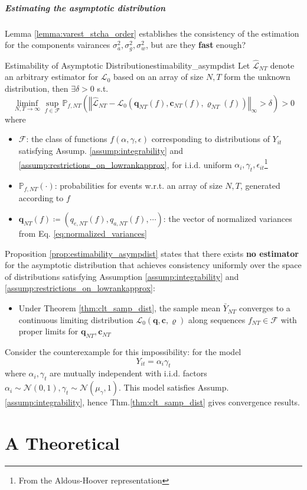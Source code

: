 \documentclass[twoside]{article}
\begin{document}
\subparagraph*{Estimating the asymptotic distribution}
Lemma \ref{lemma:varest_stcha_order} establishes the consistency of the estimation for the components vairances $\sigma^2_a,\sigma^2_g,\sigma^2_w$, but are they \textbf{fast} enough?
\begin{proposition}{Estimability of Asymptotic Distribution}{estimability_asympdist}
    Let $\hat{\mathcal{L}}_{NT}$ denote an arbitrary estimator for $\mathcal{L}_0$ based on an array of size $N,T$ form the unknown distribution, then $\exists \delta>0$ s.t. 
    \begin{equation*}
        \liminf_{N,T\rightarrow\infty} \sup_{f\in\mathcal{F}} \mathbb{P}_{f,NT} \left( \left\Vert \hat{\mathcal{L}}_{NT} - \mathcal{L}_0 \left(\mathbf{q}_{NT}(f),\mathbf{c}_{NT}(f),\varrho_{NT}(f)\right) \right\Vert _{\infty} > \delta \right) >0
    \end{equation*}
    where
    \begin{itemize}
        \item $\mathcal{F}$: the class of functions $f(\alpha,\gamma,\epsilon)$ corresponding to distributions of $Y_{it}$ satisfying Assump. \ref{assump:integrability} and \ref{assump:restrictions_on_lowrankapprox}, for i.i.d. uniform $\alpha_i,\gamma_t,\epsilon_{it}$\footnote{From the Aldous-Hoover representation}
        \item $\mathbb{P}_{f,NT}\left(\cdot\right)$: probabilities for events w.r.t. an array of size $N,T$, generated according to $f$
        \item $\mathbf{q}_{NT}(f) \coloneq \left(q_{e,NT}(f),q_{a,NT}(f),\cdots\right)$: the vector of normalized variances from Eq. \ref{eq:normalized_variances}
    \end{itemize}
\end{proposition}
Proposition \ref{prop:estimability_asympdist} states that there exists \textbf{no estimator} for the asymptotic distribution that achieves consistency uniformly over the space of distributions satisfying Assumption \ref{assump:integrability} and \ref{assump:restrictions_on_lowrankapprox}: 
\begin{itemize}
    \item Under Theorem \ref{thm:clt_samp_dist}, the sample mean $\bar{Y}_{NT}$ converges to a continuous limiting distribution $\mathcal{L}_0(\mathbf{q,c},\varrho)$ along sequences $f_{NT}\in \mathcal{F}$ with proper limits for $\mathbf{q}_{NT},\mathbf{c}_{NT}$
\end{itemize}

Consider the counterexample for this impossibility: for the model $$Y_{it} = \alpha_i\gamma_t$$ where $\alpha_i,\gamma_t$ are mutually independent with i.i.d. factors $\alpha_i \sim \mathcal{N}(0,1),\gamma_t\sim\mathcal{N}(\mu_{\gamma},1)$. This model satisfies Assump.\ref{assump:integrability}, hence 
Thm.\ref{thm:clt_samp_dist} gives convergence results.

\section*{A Theoretical}
\citet{chiang2023using}

\newpage


\end{document}
